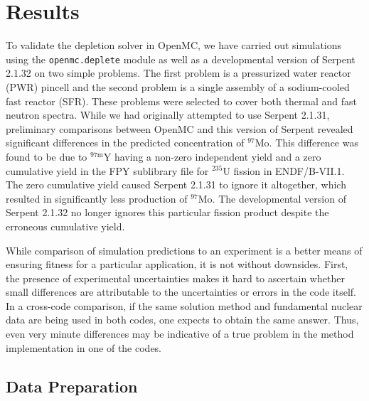 \documentclass[3p,authoryear]{elsarticle}
\begin{document}
\section{Results}
\label{sec:results}

To validate the depletion solver in OpenMC, we have carried out simulations
using the \texttt{openmc.deplete} module as well as a developmental version of
Serpent 2.1.32 on two simple problems. The first problem is a pressurized water
reactor (PWR) pincell and the second problem is a single assembly of a
sodium-cooled fast reactor (SFR). These problems were selected to cover both
thermal and fast neutron spectra. While we had originally attempted to use
Serpent 2.1.31, preliminary comparisons between OpenMC and this version of
Serpent revealed significant differences in the predicted concentration of
$^{97}$Mo. This difference was found to be due to $^{97\text{m}}$Y having a
non-zero independent yield and a zero cumulative yield in the FPY sublibrary
file for $^{235}$U fission in ENDF/B-VII.1. The zero cumulative yield caused
Serpent 2.1.31 to ignore it altogether, which resulted in significantly less
production of $^{97}$Mo. The developmental version of Serpent 2.1.32 no longer
ignores this particular fission product despite the erroneous cumulative yield.

While comparison of simulation predictions to an experiment is a better means of
ensuring fitness for a particular application, it is not without downsides.
First, the presence of experimental uncertainties makes it hard to ascertain
whether small differences are attributable to the uncertainties or errors in the
code itself. In a cross-code comparison, if the same solution method and
fundamental nuclear data are being used in both codes, one expects to obtain the
same answer. Thus, even very minute differences may be indicative of a true
problem in the method implementation in one of the codes.

\subsection{Data Preparation}
\end{document}
